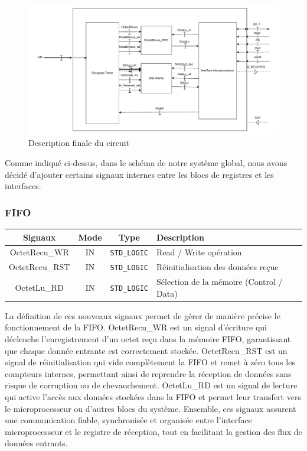 \begin{figure}[H]
    \centering
    \includegraphics[width=0.8\linewidth]{images/inter/Schema_Final.pdf}
    \caption{Description finale du circuit}
    \label{fig:placeholder}
\end{figure}

Comme indiqué ci-dessus, dans le schéma de notre système global, nous avons décidé d'ajouter 
certains signaux internes entre les blocs de registres et les interfaces.
\newline

\subsubsection*{FIFO}

\begin{center}
\renewcommand{\arraystretch}{1.2} %
\small %
    \begin{tabularx}{\textwidth}{|c||c|c|X|}
     \hline			
       \textbf{Signaux} & \textbf{Mode} & \textbf{Type} & \textbf{Description}  \\ \hline 
       OctetRecu\_WR & IN & \texttt{STD\_LOGIC} & Read / Write opération \\
       OctetRecu\_RST & IN & \texttt{STD\_LOGIC} & Réinitialisation des données reçue \\
       OctetLu\_RD & IN & \texttt{STD\_LOGIC} & Sélection de la mémoire (Control / Data) \\
     \hline  
    \end{tabularx}
\end{center}

La définition de ces nouveaux signaux permet de gérer de manière précise le fonctionnement de la 
FIFO. OctetRecu\_WR est un signal d'écriture qui déclenche l'enregistrement d'un octet reçu dans 
la mémoire FIFO, garantissant que chaque donnée entrante est correctement stockée. OctetRecu\_RST 
est un signal de réinitialisation qui vide complètement la FIFO et remet à zéro tous les compteurs 
internes, permettant ainsi de reprendre la réception de données sans risque de corruption ou de 
chevauchement. OctetLu\_RD est un signal de lecture qui active l'accès aux données stockées dans 
la FIFO et permet leur transfert vers le microprocesseur ou d'autres blocs du système. Ensemble, 
ces signaux assurent une communication fiable, synchronisée et organisée entre l'interface 
microprocesseur et le registre de réception, tout en facilitant la gestion des flux de données 
entrants.
\newline

